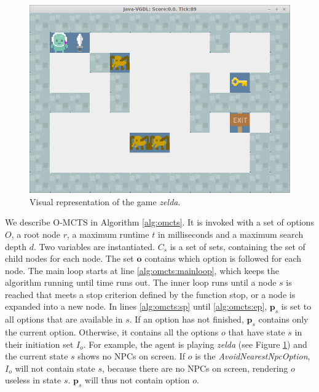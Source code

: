\begin{figure}
	\centering
	\includegraphics[width=\columnwidth]{includes/zelda}
	\caption{Visual representation of the game \textit{zelda}.}
	\label{fig:zelda}
\end{figure}

We describe O-MCTS in Algorithm \ref{alg:omcts}. It is invoked with a set of
options $O$, a root node $r$, a maximum runtime $t$ in milliseconds and a
maximum search depth $d$. Two variables are instantiated. $C_s$ is a set of
sets, containing the set of child nodes for each node. The set $\mathbf{o}$
contains which option is followed for each node. The main loop starts at line
\ref{alg:omcts:mainloop}, which keeps the algorithm running until time runs out.
The inner loop runs until a node $s$ is reached that meets a stop criterion
defined by the function \textsf{stop}, or a node is expanded into a new node.
In lines \ref{alg:omcts:sp} until \ref{alg:omcts:ep}, $\mathbf{p}_s$ is set to
all options that are available in $s$. If an option has not finished,
$\mathbf{p}_s$ contains only the current option. Otherwise, it contains all the
options $o$ that have state $s$ in their initiation set $I_o$. For example,
the agent is playing \textit{zelda} (see Figure \ref{fig:zelda}) and the current
state $s$ shows no NPCs on screen. If $o$ is the \textit{AvoidNearestNpcOption},
$I_o$ will not contain state $s$, because there are no NPCs on screen, rendering
$o$ useless in state $s$. $\mathbf{p}_s$ will thus not contain option $o$.

